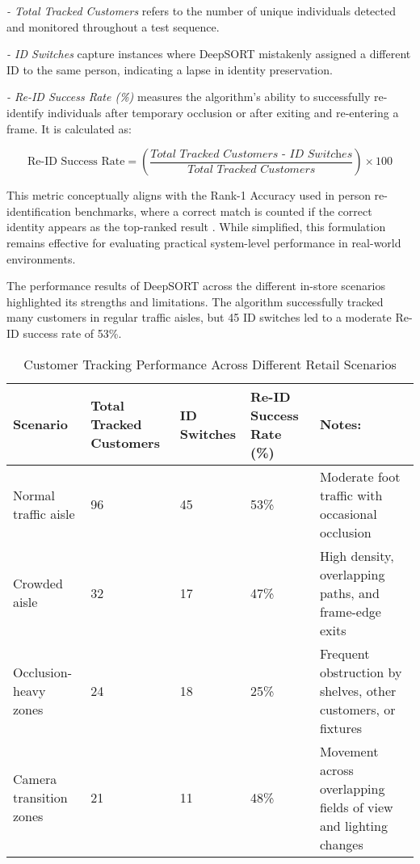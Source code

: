 {\textit{- Total Tracked Customers} refers to the number of unique individuals detected and monitored throughout a test sequence.

\textit{- ID Switches} capture instances where DeepSORT mistakenly assigned a different ID to the same person, indicating a lapse in identity preservation.

\textit{- Re-ID Success Rate (\%)} measures the algorithm's ability to successfully re-identify individuals after temporary occlusion or after exiting and re-entering a frame. It is calculated as:

\begin{equation}
	\text{Re-ID Success Rate} = (\frac{\textit{Total Tracked Customers - ID Switches}}{\textit{Total Tracked Customers}}) \times 100
\end{equation}

This metric conceptually aligns with the Rank-1 Accuracy used in person re-identification benchmarks, where a correct match is counted if the correct identity appears as the top-ranked result \citep{Zheng2015}. While simplified, this formulation remains effective for evaluating practical system-level performance in real-world environments.

The performance results of DeepSORT across the different in-store scenarios highlighted its strengths and limitations. The algorithm successfully tracked many customers in regular traffic aisles, but 45 ID switches led to a moderate Re-ID success rate of 53\%.

\begin{table}[H]
	\centering
	\caption[Customer Tracking Performance Across Different Retail Scenarios]{\newline \newline Customer Tracking Performance Across Different Retail Scenarios}
	\begin{tabular}{|p{1.5cm}|p{1.5cm}|p{1.5cm}|p{1.8cm}|p{3.5cm}|}
		\hline
		\textbf{Scenario} & \textbf{Total Tracked Customers} & \textbf{ID Switches} & \textbf{Re-ID Success Rate (\%)} & \textbf{Notes:} \\
		\hline
		Normal traffic aisle & 96 & 45 & 53\% & Moderate foot traffic with occasional occlusion \\
		\hline
		Crowded aisle & 32 & 17 & 47\% & High density, overlapping paths, and frame-edge exits \\
		\hline
		Occlusion-heavy zones & 24 & 18 & 25\% & Frequent obstruction by shelves, other customers, or fixtures \\
		\hline
		Camera transition zones & 21 & 11 & 48\% & Movement across overlapping fields of view and lighting changes \\
		\hline
	\end{tabular}
	\label{tab:customer_tracking}
\end{table}

}
